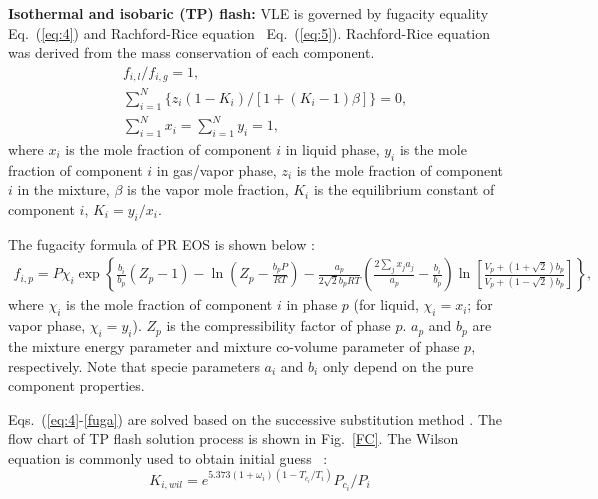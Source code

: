 \textbf{Isothermal and isobaric (TP) flash:}
VLE is governed by fugacity equality Eq.~(\ref{eq:4}) and Rachford-Rice equation~\cite{rachford1952procedure} Eq.~(\ref{eq:5}). Rachford-Rice equation was derived from the mass conservation of each component.
\begin{align}
&f_{i, l}\big/f_{i, g}=1,  \label{eq:4} \\
&\sum_{i=1}^{N}\bigg\{z_i\left(1-K_i\right)\bigg/\left[1+\left(K_i-1\right)\beta\right]\bigg\}=0, \label{eq:5} \\
&\sum_{i=1}^{N}x_i=\sum_{i=1}^{N}y_i=1,  \label{eq:5-2}
\end{align}
where $x_i$ is the mole fraction of component $i$ in liquid phase, $y_i$ is the mole fraction of component $i$ in gas/vapor phase, $z_i$ is the mole fraction of component $i$ in the mixture, $\beta$ is the vapor mole fraction, $K_i$ is the equilibrium constant of component $i$, $K_i=y_i/x_i$. %




 
The fugacity formula of PR EOS is shown below \cite{yi2019multicomponent}:
\begin{align}
f_{i,p}=P \chi_i \exp \left\{\frac{b_i}{b_p}(Z_p - 1) - \ln(Z_p-\frac{b_p P}{RT}) - \frac{a_p} {2\sqrt{2} b_p R T} \left(\frac{2 \sum_j {x_j a_j} } {a_p} - \frac {b_i} {b_p}\right) \ln\left[\frac{V_p + \left(1+\sqrt{2}\right)b_p} {V_p + \left(1-\sqrt{2}\right) b_p}\right]\right\}, \label{fuga}
\end{align}
where $\chi_i$ is the mole fraction of component $i$ in phase $p$ (for liquid, $\chi_i=x_i$; for vapor phase, $\chi_i=y_i$). $Z_p$ is the compressibility factor of phase $p$. $a_p$ and $b_p$ are the mixture energy parameter and mixture co-volume parameter of phase $p$, respectively. Note that specie parameters $a_i$ and $b_i$ only depend on the pure component properties.

Eqs.~(\ref{eq:4}-\ref{fuga}) are solved based on the successive substitution method \cite{michelsen2007thermodynamic}. The flow chart of TP flash solution process is shown in Fig.~\ref{FC}.  The Wilson equation is commonly used to obtain initial guess ~\cite{wilson1964vapor}:
\begin{equation}
K_{i,wil}=e^{5.373(1+\omega_i)(1-T_{c_i}/T_i)}P_{c_i}/P_i
\end{equation}

